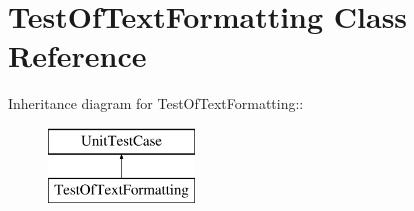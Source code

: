 \hypertarget{class_test_of_text_formatting}{
\section{TestOfTextFormatting Class Reference}
\label{class_test_of_text_formatting}
}
Inheritance diagram for TestOfTextFormatting::\begin{figure}[H]
\begin{center}
\leavevmode
\includegraphics[height=2cm]{class_test_of_text_formatting}
\end{center}
\end{figure}

